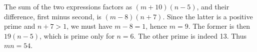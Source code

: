 The sum of the two expressions factors as $(m+10)(n-5)$, and their difference, first minus second, is $(m-8)(n+7)$. Since the latter is a positive prime and $n+7>1$, we must have $m-8=1$, hence $m=9$. The former is then $19(n-5)$, which is prime only for $n=6$. The other prime is indeed 13. Thus $\boxed{mn=54}$.
